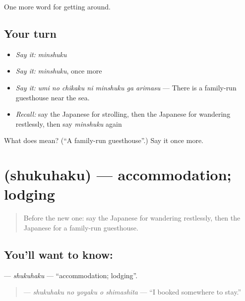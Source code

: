 \begin{grammarlens}[title={What you've built}]
One more word for getting around.
\end{grammarlens}

\subsection*{Your turn}
\begin{itemize}
\raggedright
  \item \emph{Say it:} \emph{minshuku}
  \item \emph{Say it:} \emph{minshuku}, once more
  \item \emph{Say it:} \emph{umi no chikaku ni minshuku ga arimasu} — There is a family-run guesthouse near the sea.
  \item \emph{Recall:} say the Japanese for strolling, then the Japanese for wandering restlessly, then say \emph{minshuku} again
\end{itemize}

\begin{tcolorbox}[breakable,colback=teal!4,colframe=teal!35!black,title={Before you move on}]
What does  mean? (\textquotedblleft{}A family-run guesthouse\textquotedblright{}.) Say it once more.
\end{tcolorbox}
\section[\texorpdfstring{\ja{しゅくはく} (shukuhaku)}{しゅくはく (shukuhaku)}]{ (shukuhaku) — accommodation; lodging}

\label{lesson:JA-C397-shukuhaku}



\begin{quote}
Before the new one: say the Japanese for wandering restlessly, then the Japanese for a family-run guesthouse.
\end{quote}

\subsection*{You'll want to know: }
\textbf{} — \emph{shukuhaku} — \textquotedblleft{}accommodation; lodging\textquotedblright{}.

\begin{quote}
\textbf{  } — \emph{shukuhaku no yoyaku o shimashita} — \textquotedblleft{}I booked somewhere to stay.\textquotedblright{}
\end{quote}

